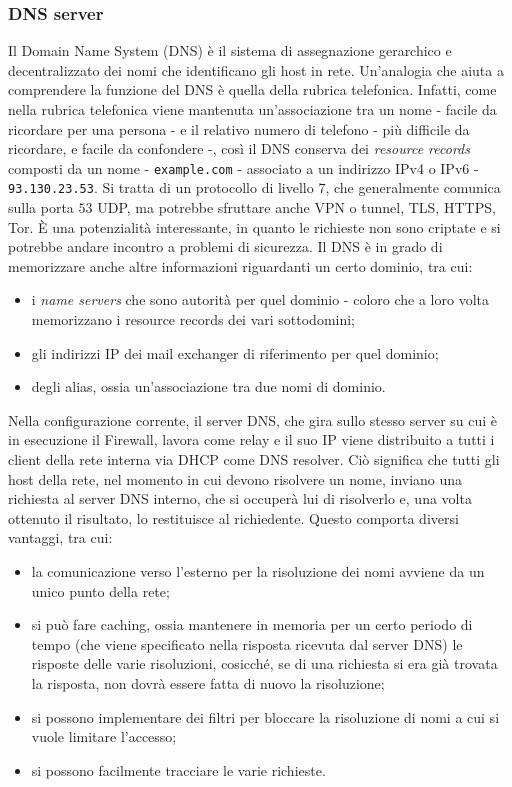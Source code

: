 \subsubsection{DNS server}
Il Domain Name System (DNS) è il sistema di assegnazione gerarchico e decentralizzato dei nomi che identificano gli host in rete. Un'analogia che aiuta a comprendere la funzione del DNS è quella della rubrica telefonica.
Infatti, come nella rubrica telefonica viene mantenuta un'associazione tra un nome - facile da ricordare per una persona -  e il relativo numero di telefono - più difficile da ricordare, e facile da confondere -, così il DNS conserva dei \emph{resource records} composti da un nome - \texttt{example.com} - associato a un indirizzo IPv4 o IPv6 -  \texttt{93.130.23.53}.
Si tratta di un protocollo di livello $7$, che generalmente comunica sulla porta $53$ UDP, ma potrebbe sfruttare anche VPN o tunnel, TLS, HTTPS, Tor. È una potenzialità interessante, in quanto le richieste non sono criptate e si potrebbe andare incontro a problemi di sicurezza.
Il DNS è in grado di memorizzare anche altre informazioni riguardanti un certo dominio, tra cui:
\begin{itemize}
    \item i \emph{name servers} che sono autorità per quel dominio - coloro che a loro volta memorizzano i resource records dei vari sottodomini;
    \item gli indirizzi IP dei mail exchanger di riferimento per quel dominio;
    \item degli alias, ossia un'associazione tra due nomi di dominio.
\end{itemize}
Nella configurazione corrente, il server DNS, che gira sullo stesso server su cui è in esecuzione il Firewall, lavora come relay e il suo IP viene distribuito a tutti i client della rete interna via DHCP come DNS resolver.
Ciò significa che tutti gli host della rete, nel momento in cui devono risolvere un nome, inviano una richiesta al server DNS interno, che si occuperà lui di risolverlo e, una volta ottenuto il risultato, lo restituisce al richiedente.
\newpage
Questo comporta diversi vantaggi, tra cui:
\begin{itemize}
    \item la comunicazione verso l'esterno per la risoluzione dei nomi avviene da un unico punto della rete;
    \item si può fare caching, ossia mantenere in memoria per un certo periodo di tempo (che viene specificato nella risposta ricevuta dal server DNS) le risposte delle varie risoluzioni, cosicché, se di una richiesta si era già trovata la risposta, non dovrà essere fatta di nuovo la risoluzione;
    \item si possono implementare dei filtri per bloccare la risoluzione di nomi a cui si vuole limitare l'accesso;
    \item si possono facilmente tracciare le varie richieste.
\end{itemize}

